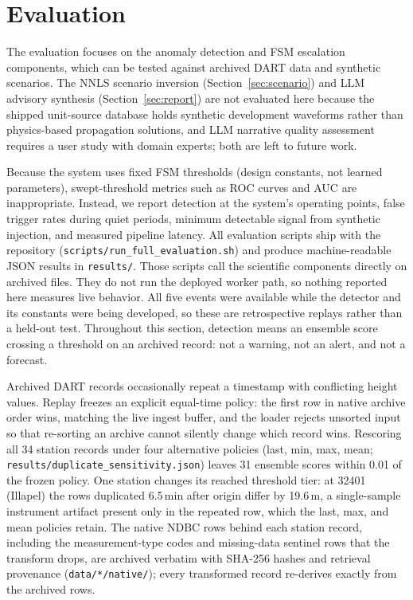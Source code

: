 \documentclass{article}
\begin{document}

\section{Evaluation}
\label{sec:evaluation}

The evaluation focuses on the anomaly detection and FSM escalation
components, which can be tested against archived DART data and
synthetic scenarios.  The NNLS scenario inversion
(Section~\ref{sec:scenario}) and LLM advisory synthesis
(Section~\ref{sec:report}) are not evaluated here because the shipped
unit-source database holds synthetic development waveforms rather
than physics-based propagation solutions, and LLM narrative
quality assessment requires a user study with domain experts; both
are left to future work.

Because the system uses fixed FSM thresholds (design constants, not
learned parameters), swept-threshold metrics such as ROC curves and
AUC are inappropriate.  Instead, we report detection at the system's
operating points, false trigger rates during quiet periods, minimum
detectable signal from synthetic injection, and measured pipeline
latency.  All evaluation scripts ship with the repository
(\texttt{scripts/run\_full\_evaluation.sh}) and produce
machine-readable JSON results in \texttt{results/}.
Those scripts call the scientific components directly on archived
files.  They do not run the deployed worker path, so nothing reported
here measures live behavior.  All five events were available while the
detector and its constants were being developed, so these are
retrospective replays rather than a held-out test.  Throughout this
section, detection means an ensemble score crossing a threshold on an
archived record: not a warning, not an alert, and not a forecast.

Archived DART records occasionally repeat a timestamp with conflicting
height values.  Replay freezes an explicit equal-time policy: the first
row in native archive order wins, matching the live ingest buffer, and
the loader rejects unsorted input so that re-sorting an archive cannot
silently change which record wins.  Rescoring all 34 station records
under four alternative policies (last, min, max, mean;
\texttt{results/duplicate\_sensitivity.json}) leaves 31 ensemble scores
within 0.01 of the frozen policy.  One station changes its reached
threshold tier: at 32401 (Illapel) the rows duplicated 6.5\,min after
origin differ by 19.6\,m, a single-sample instrument artifact present
only in the repeated row, which the last, max, and mean policies
retain.
The native NDBC rows behind each station record, including the
measurement-type codes and missing-data sentinel rows that the
transform drops, are archived verbatim with SHA-256 hashes and
retrieval provenance (\texttt{data/*/native/}); every transformed
record re-derives exactly from the archived rows.
\end{document}
